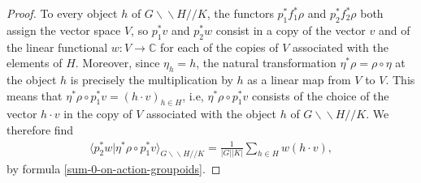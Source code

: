 \documentclass[12pt]{scrartcl}
\theoremstyle{definition}
\numberwithin{equation}{section}
\numberwithin{definition}{section}
\numberwithin{figure}{section}
\begin{document}
\begin{proof}
To every object $h$ of $G\backslash\!\backslash H/\!/K$, the functors $p_1^*f_1^*\rho$ and $p_2^*f_2^*\rho$ both assign the vector space $V$, so $p_1^*v$ and $p_2^*w$ consist in a copy of the vector $v$ and of the linear functional $w\colon V\to \mathbb{C}$ for each of the copies of $V$ associated with the elements of $H$. Moreover, since $\eta_h=h$, the natural transformation $\eta^*\rho=\rho\circ\eta$ at the object $h$ is precisely the multiplication by $h$ as a linear map from $V$ to $V$. This means that $\eta^*\rho\circ p_1^*v=(h\cdot v)_{h\in H}$, i.e, $\eta^*\rho\circ p_1^*v$  consists of the choice of the vector $h\cdot v$ in the copy of $V$ associated with the object $h$ of $G\backslash\!\backslash H/\!/K$. We therefore find
\begin{align*}
\langle p_2^*w|\eta^*\rho\circ p_1^*v\rangle_{G\backslash\!\backslash H/\!/K}=\frac{1}{|G||K|}\sum_{h\in H}w(h\cdot v),
\end{align*}
by formula \ref{sum-0-on-action-groupoids}.
\end{proof}
\end{document}
